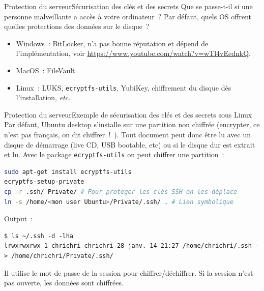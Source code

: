 \documentclass{beamer}
\begin{document}
    \begin{frame}{Protection du serveur}{Sécurisation des clés et des secrets}
        Que se passe-t-il si une personne malveillante a accès à votre ordinateur~?
        \bigbreak
        Par défaut, quels OS offrent quelles protections des données sur le disque~?
        \pause
        \bigbreak
        \begin{itemize}
            \item Windows~: BitLocker, n'a pas bonne réputation et dépend de l'implémentation, voir \url{https://www.youtube.com/watch?v=wTl4vEednkQ}.
            \item MacOS~: FileVault.
            \item Linux~: LUKS, \lstinline{ecryptfs-utils}, YubiKey, chiffrement du disque dès l'installation, \textit{etc}.
        \end{itemize}
    \end{frame}

    \begin{frame}[fragile]{Protection du serveur}{Exemple de sécurisation des clés et des secrets sous Linux}
        Par défaut, Ubuntu desktop s’installe sur une partition non
        chiffrée (encrypter, ce n’est pas français, on dit chiffrer~!~).
        Tout document peut donc être lu avec un disque de
        démarrage (live CD, USB bootable, etc) ou si le disque dur
        est extrait et lu.
        \bigbreak
        Avec le package \lstinline{ecryptfs-utils} on peut chiffrer une partition~:
        \begin{lstlisting}[language=bash]
sudo apt-get install ecryptfs-utils
ecryptfs-setup-private
cp -r .ssh/ Private/ # Pour proteger les clés SSH on les déplace
ln -s /home/<mon user Ubuntu>/Private/.ssh/ . # Lien symbolique
        \end{lstlisting}
        Output~:
        \begin{lstlisting}
$ ls ~/.ssh -d -lha
lrwxrwxrwx 1 chrichri chrichri 28 janv. 14 21:27 /home/chrichri/.ssh -> /home/chrichri/Private/.ssh/
        \end{lstlisting}
        Il utilise le mot de passe de la session pour chiffrer/déchiffrer.
        Si la session n'est pas ouverte, les données sont chiffrées.
    \end{frame}
\end{document}

